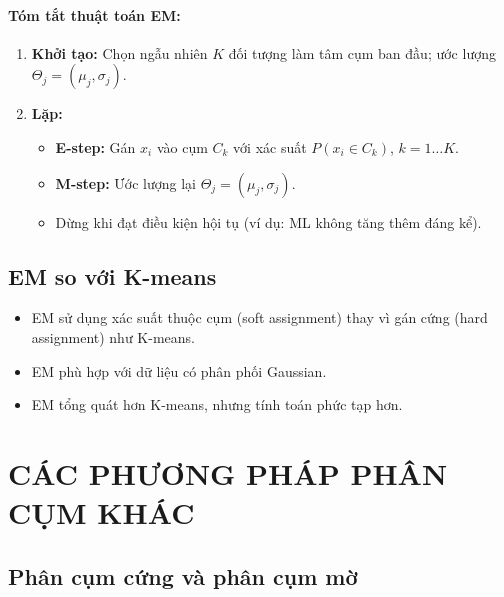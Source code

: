 \documentclass[10pt]{article}
\begin{document}
\paragraph{Tóm tắt thuật toán EM:}
\begin{enumerate}
    \item \textbf{Khởi tạo:} Chọn ngẫu nhiên $K$ đối tượng làm tâm cụm ban đầu; ước lượng $\Theta_j = (\mu_j, \sigma_j)$.
    \item \textbf{Lặp:}
    \begin{itemize}
        \item \textbf{E-step:} Gán $x_i$ vào cụm $C_k$ với xác suất $P(x_i \in C_k)$, $k=1\ldots K$.
        \item \textbf{M-step:} Ước lượng lại $\Theta_j = (\mu_j, \sigma_j)$.
        \item Dừng khi đạt điều kiện hội tụ (ví dụ: ML không tăng thêm đáng kể).
    \end{itemize}
\end{enumerate}

\subsection{EM so với K-means}

\begin{itemize}
    \item EM sử dụng xác suất thuộc cụm (soft assignment) thay vì gán cứng (hard assignment) như K-means.
    \item EM phù hợp với dữ liệu có phân phối Gaussian.
    \item EM tổng quát hơn K-means, nhưng tính toán phức tạp hơn.
\end{itemize}

\section{CÁC PHƯƠNG PHÁP PHÂN CỤM KHÁC}

\subsection{Phân cụm cứng và phân cụm mờ}
\end{document}
